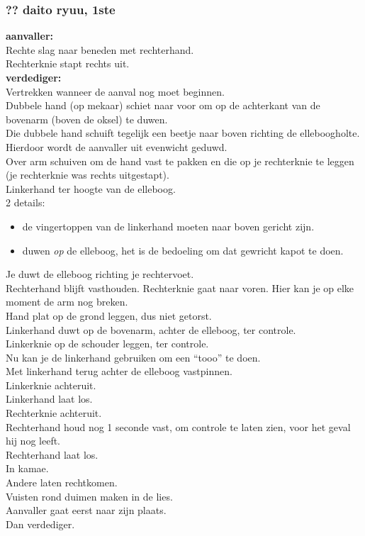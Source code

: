 \subsubsection{?? daito ryuu, 1ste}
\textbf{aanvaller:}\\
Rechte slag naar beneden met rechterhand.\\
Rechterknie stapt rechts uit.\\
\textbf{verdediger:}\\
Vertrekken wanneer de aanval nog moet beginnen.\\
Dubbele hand (op mekaar) schiet naar voor om op de achterkant van de bovenarm (boven de oksel) te duwen.\\
Die dubbele hand schuift tegelijk een beetje naar boven richting de elleboogholte.\\
Hierdoor wordt de aanvaller uit evenwicht geduwd.\\
Over arm schuiven om de hand vast te pakken en die op je rechterknie te leggen (je rechterknie was rechts uitgestapt).\\
Linkerhand ter hoogte van de elleboog.\\
2 details:
\begin{itemize}
    \item de vingertoppen van de linkerhand moeten naar boven gericht zijn.
    \item duwen \textit{op} de elleboog, het is de bedoeling om dat gewricht kapot te doen.
\end{itemize}
Je duwt de elleboog richting je rechtervoet.\\
Rechterhand blijft vasthouden. Rechterknie gaat naar voren. Hier kan je op elke moment de arm nog breken.\\
Hand plat op de grond leggen, dus niet getorst.\\
Linkerhand duwt op de bovenarm, achter de elleboog, ter controle.\\
Linkerknie op de schouder leggen, ter controle.\\
Nu kan je de linkerhand gebruiken om een ``tooo'' te doen.\\
Met linkerhand terug achter de elleboog vastpinnen.\\
Linkerknie achteruit.\\
Linkerhand laat los.\\
Rechterknie achteruit.\\
Rechterhand houd nog 1 seconde vast, om controle te laten zien, voor het geval hij nog leeft.\\
Rechterhand laat los.\\
In kamae.\\
Andere laten rechtkomen.\\
Vuisten rond duimen maken in de lies.\\
Aanvaller gaat eerst naar zijn plaats.\\
Dan verdediger.

